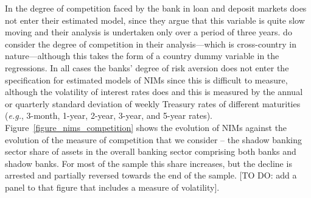 \documentclass[11pt]{article}
\begin{document}
In  the degree of competition faced by the bank in loan and deposit markets does not enter their estimated model, since they argue that this variable is quite slow moving and their analysis is undertaken only over a period of three years.   do consider the degree of competition in their analysis---which is cross-country in nature---although this takes the form of a country dummy variable in the regressions. In all cases the banks' degree of risk aversion does not enter the specification for estimated models of NIMs since this is difficult to measure, although the volatility of interest rates does and this is measured by the annual or quarterly standard deviation of weekly Treasury rates of different maturities (\textit{e.g.}, 3-month, 1-year, 2-year, 3-year, and 5-year rates). Figure~\ref{figure_nims_competition} shows the evolution of NIMs against the evolution of the measure of competition that we consider -- the shadow banking sector share of assets in the overall banking sector comprising both banks and shadow banks.  For most of the sample this share increases, but the decline is arrested and partially reversed towards the end of the sample. [TO DO: add a panel to that figure that includes a measure of volatility].
\end{document}

